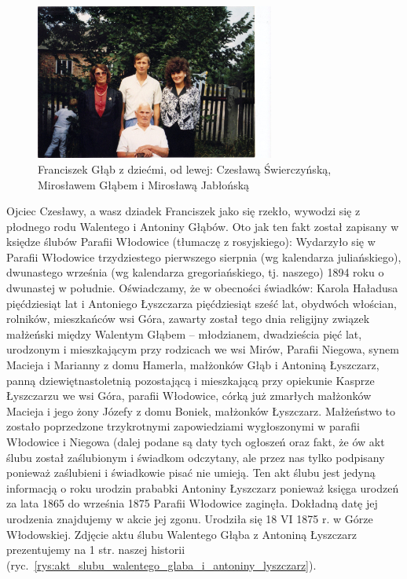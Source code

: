 \begin{figure}[!h]
\begin{center}
\includegraphics[width=0.7\textwidth]{zdjecia/franciszek_glab_z_dziecmi.jpg}
\caption[Franciszek Głąb z dziećmi]{Franciszek Głąb z dziećmi, od lewej: Czesławą Świerczyńską, Mirosławem Głąbem i Mirosławą Jabłońską}
\label{rys:franciszek_glab_z_dziecmi}
\end{center}
\end{figure}

Ojciec Czesławy, a wasz dziadek Franciszek jako się rzekło, wywodzi się z płodnego rodu Walentego i Antoniny Głąbów. Oto jak ten fakt został zapisany w księdze ślubów Parafii Włodowice (tłumaczę z rosyjskiego): Wydarzyło się w Parafii Włodowice trzydziestego pierwszego sierpnia (wg kalendarza juliańskiego), dwunastego września (wg kalendarza gregoriańskiego, tj. naszego) 1894 roku o dwunastej w południe. Oświadczamy, że w obecności świadków: Karola Haładusa pięćdziesiąt lat i Antoniego Łyszczarza pięćdziesiąt sześć lat, obydwóch włościan, rolników, mieszkańców wsi Góra, zawarty został tego dnia religijny związek małżeński między Walentym Głąbem – młodzianem, dwadzieścia pięć lat, urodzonym i mieszkającym przy rodzicach we wsi Mirów, Parafii Niegowa, synem Macieja i Marianny z domu Hamerla, małżonków Głąb i Antoniną Łyszczarz, panną dziewiętnastoletnią pozostającą i mieszkającą przy opiekunie Kasprze Łyszczarzu we wsi Góra, parafii Włodowice, córką już zmarłych małżonków Macieja i jego żony Józefy z domu Boniek, małżonków Łyszczarz. Małżeństwo to zostało poprzedzone trzykrotnymi zapowiedziami wygłoszonymi w parafii Włodowice i Niegowa (dalej podane są daty tych ogłoszeń oraz fakt, że ów akt ślubu został zaślubionym i świadkom odczytany, ale przez nas tylko podpisany ponieważ zaślubieni i świadkowie pisać nie umieją. Ten akt ślubu jest jedyną informacją o roku urodzin prababki Antoniny Łyszczarz ponieważ księga urodzeń za lata 1865 do września 1875 Parafii Włodowice zaginęła. Dokładną datę jej urodzenia znajdujemy w akcie jej zgonu. Urodziła się 18 VI 1875 r. w Górze Włodowskiej. Zdjęcie aktu ślubu Walentego Głąba z Antoniną Łyszczarz prezentujemy na 1 str. naszej historii (ryc.~\ref{rys:akt_slubu_walentego_glaba_i_antoniny_lyszczarz}).

